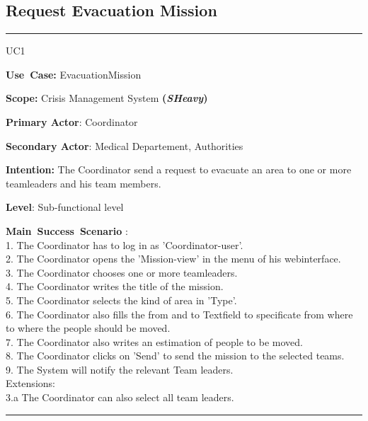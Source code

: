 \subsection{Request Evacuation Mission}
\vspace{0.5cm}
\hrule
\vspace{0.5cm}
\begin{lyxlist}{UC1}
\small{
\item [\textbf{Use~Case:}] EvacuationMission
\item [\textbf{Scope:}] Crisis Management System \textbf{(\emph{SHeavy})}
\item [\textbf{Primary Actor}:] Coordinator
\item [\textbf{Secondary Actor}:] Medical Departement, Authorities
\item [\textbf{Intention:}]The Coordinator send a request to evacuate an area
to one or more teamleaders and his team members.
\item [\textbf{Level}:]Sub-functional level
\item [\textbf{Main~Success~Scenario}]:\\
1. The Coordinator has to log in as 'Coordinator-user'.\\
2. The Coordinator opens the 'Mission-view' in the menu of his webinterface.\\
3. The Coordinator chooses one or more teamleaders.\\
4. The Coordinator writes the title of the mission.\\
5. The Coordinator selects the kind of area in 'Type'.\\
6. The Coordinator also fills the from and to Textfield to specificate from where to where
the people should be moved.\\
7. The Coordinator also writes an estimation of people to be moved.\\
8. The Coordinator clicks on 'Send' to send the mission to the selected
teams.\\
9. The System will notify the relevant Team leaders.\\
Extensions:\\
	3.a The Coordinator can also select all team leaders.\\
}
\end{lyxlist}
\hrule 
\vspace{0.5cm} 

